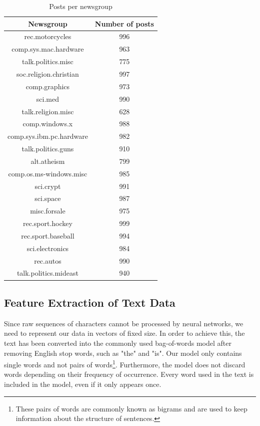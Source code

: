 \documentclass[sigconf]{acmart}
\begin{document}
\begin{table}[]
	\centering
	\caption{Posts per newsgroup}
	\label{tab:groups}
	\begin{tabular}{c|c}
		\hline
		       Newsgroup         & Number of posts \\ \hline
		    rec.motorcycles      &       996       \\
		 comp.sys.mac.hardware   &       963       \\
		   talk.politics.misc    &       775       \\
		 soc.religion.christian  &       997       \\
		     comp.graphics       &       973       \\
		        sci.med          &       990       \\
		   talk.religion.misc    &       628       \\
		     comp.windows.x      &       988       \\
		comp.sys.ibm.pc.hardware &       982       \\
		   talk.politics.guns    &       910       \\
		      alt.atheism        &       799       \\
		comp.os.ms-windows.misc  &       985       \\
		       sci.crypt         &       991       \\
		       sci.space         &       987       \\
		      misc.forsale       &       975       \\
		    rec.sport.hockey     &       999       \\
		   rec.sport.baseball    &       994       \\
		    sci.electronics      &       984       \\
		       rec.autos         &       990       \\
		 talk.politics.mideast   &       940
	\end{tabular}
\end{table}

\subsection{Feature Extraction of Text Data}
\label{sec:feature}

Since raw sequences of characters cannot be processed by neural networks, we need to represent our data in vectors of fixed size. In order to achieve this, the text has been converted into the commonly used bag-of-words model after removing English stop words, such as "the" and "is". Our model only contains single words and not pairs of words\footnote{These pairs of words are commonly known as bigrams and are used to keep information about the structure of sentences.}. Furthermore, the model does not discard words depending on their frequency of occurrence. Every word used in the text is included in the model, even if it only appears once.
\end{document}
